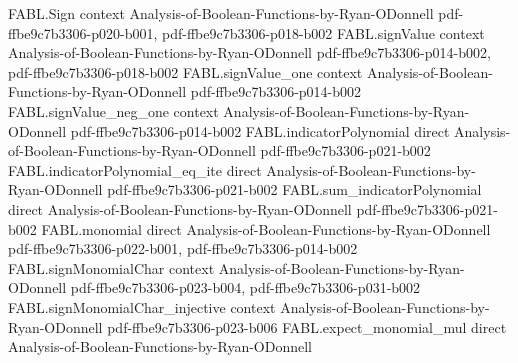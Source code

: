 \begin{theorem}
\label{FABL.stableInfluence_one_third_sq_le_booleanInfluence_cube}
\leanok
{}
\proofstep
  {FABL.Sign}
  {context}
  {Analysis-of-Boolean-Functions-by-Ryan-ODonnell}
  {pdf-ffbe9c7b3306-p020-b001,
    pdf-ffbe9c7b3306-p018-b002}
\proofstep
  {FABL.signValue}
  {context}
  {Analysis-of-Boolean-Functions-by-Ryan-ODonnell}
  {pdf-ffbe9c7b3306-p014-b002,
    pdf-ffbe9c7b3306-p018-b002}
\proofstep
  {FABL.signValue_one}
  {context}
  {Analysis-of-Boolean-Functions-by-Ryan-ODonnell}
  {pdf-ffbe9c7b3306-p014-b002}
\proofstep
  {FABL.signValue_neg_one}
  {context}
  {Analysis-of-Boolean-Functions-by-Ryan-ODonnell}
  {pdf-ffbe9c7b3306-p014-b002}
\proofstep
  {FABL.indicatorPolynomial}
  {direct}
  {Analysis-of-Boolean-Functions-by-Ryan-ODonnell}
  {pdf-ffbe9c7b3306-p021-b002}
\proofstep
  {FABL.indicatorPolynomial_eq_ite}
  {direct}
  {Analysis-of-Boolean-Functions-by-Ryan-ODonnell}
  {pdf-ffbe9c7b3306-p021-b002}
\proofstep
  {FABL.sum_indicatorPolynomial}
  {direct}
  {Analysis-of-Boolean-Functions-by-Ryan-ODonnell}
  {pdf-ffbe9c7b3306-p021-b002}
\proofstep
  {FABL.monomial}
  {direct}
  {Analysis-of-Boolean-Functions-by-Ryan-ODonnell}
  {pdf-ffbe9c7b3306-p022-b001,
    pdf-ffbe9c7b3306-p014-b002}
\proofstep
  {FABL.signMonomialChar}
  {context}
  {Analysis-of-Boolean-Functions-by-Ryan-ODonnell}
  {pdf-ffbe9c7b3306-p023-b004,
    pdf-ffbe9c7b3306-p031-b002}
\proofstep
  {FABL.signMonomialChar_injective}
  {context}
  {Analysis-of-Boolean-Functions-by-Ryan-ODonnell}
  {pdf-ffbe9c7b3306-p023-b006}
\proofstep
  {FABL.expect_monomial_mul}
  {direct}
  {Analysis-of-Boolean-Functions-by-Ryan-ODonnell}

\end{theorem}
